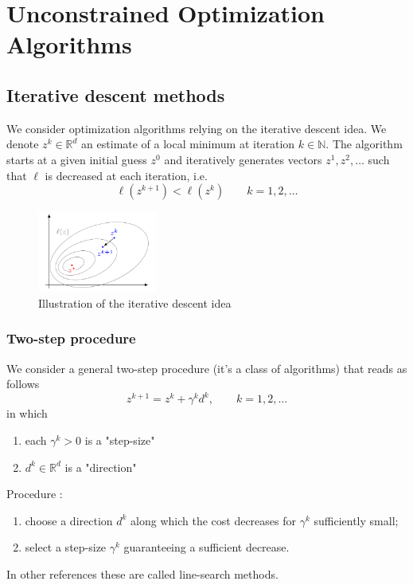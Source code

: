 \documentclass[openany]{book}
\newcommand{\R}{\mathbb{R}}                %
\newcommand{\N}{\mathbb{N}}                %
\theoremstyle{definition}
\theoremstyle{remark}
\begin{document}
\section{Unconstrained Optimization Algorithms}
\subsection{Iterative descent methods}
We consider optimization algorithms relying on the iterative descent idea. We denote $z^k\in\R^d$ an estimate of a local minimum at iteration $k\in\N$. The algorithm starts at a given initial guess $z^0$ and iteratively generates vectors $z^1,z^2,\dots$ such that $\ell$ is decreased at each iteration, i.e. 
\[
    \ell(z^{k+1})<\ell(z^k) \qquad k = 1,2,\dots
\]
\begin{figure}[ht]
    \centering
    \includegraphics[width=0.35\textwidth]{descent}
    \caption{Illustration of the iterative descent idea}
\end{figure}
\subsubsection{Two-step procedure}
We consider a general two-step procedure (it's a class of algorithms) that reads as follows 
\[
    z^{k+1} = z^k+\gamma^k d^k, \qquad k=1,2,\dots
\]
in which 
\begin{enumerate}
    \item each $\gamma^k>0$ is a "step-size" 
    \item $d^k\in\R^d$ is a "direction"
\end{enumerate}
Procedure : 
\begin{enumerate}
    \item choose a direction $d^k$ along which the cost decreases for $\gamma^k$ sufficiently small;
    \item select a step-size $\gamma^k$ guaranteeing a sufficient decrease. 
\end{enumerate}
In other references these are called line-search methods.
\end{document}
